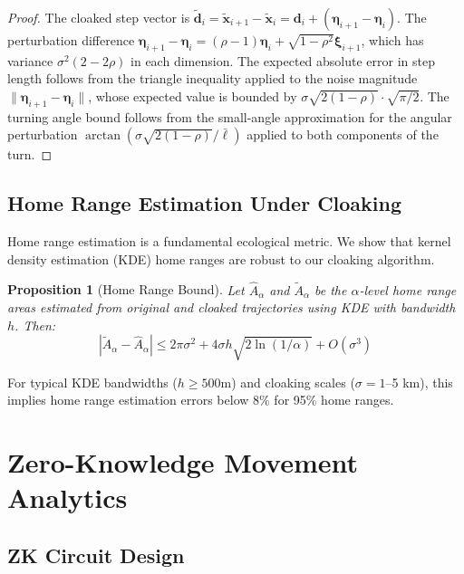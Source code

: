 \documentclass[11pt,letterpaper]{article}
\newtheorem{proposition}[theorem]{Proposition}
\begin{document}
\begin{proof}
The cloaked step vector is $\tilde{\mathbf{d}}_i = \tilde{\mathbf{x}}_{i+1} - \tilde{\mathbf{x}}_i = \mathbf{d}_i + (\boldsymbol{\eta}_{i+1} - \boldsymbol{\eta}_i)$. The perturbation difference $\boldsymbol{\eta}_{i+1} - \boldsymbol{\eta}_i = (\rho - 1)\boldsymbol{\eta}_i + \sqrt{1-\rho^2}\boldsymbol{\xi}_{i+1}$, which has variance $\sigma^2(2 - 2\rho)$ in each dimension. The expected absolute error in step length follows from the triangle inequality applied to the noise magnitude $\|\boldsymbol{\eta}_{i+1} - \boldsymbol{\eta}_i\|$, whose expected value is bounded by $\sigma\sqrt{2(1-\rho)} \cdot \sqrt{\pi/2}$. The turning angle bound follows from the small-angle approximation for the angular perturbation $\arctan(\sigma\sqrt{2(1-\rho)}/\bar{\ell})$ applied to both components of the turn.
\end{proof}

\subsection{Home Range Estimation Under Cloaking}

Home range estimation is a fundamental ecological metric. We show that kernel density estimation (KDE) home ranges are robust to our cloaking algorithm.

\begin{proposition}[Home Range Bound]
Let $\hat{A}_\alpha$ and $\tilde{A}_\alpha$ be the $\alpha$-level home range areas estimated from original and cloaked trajectories using KDE with bandwidth $h$. Then:
\begin{equation}
|\tilde{A}_\alpha - \hat{A}_\alpha| \leq 2\pi \sigma^2 + 4\sigma h \sqrt{2\ln(1/\alpha)} + O(\sigma^3)
\end{equation}
\end{proposition}

For typical KDE bandwidths ($h \geq 500$m) and cloaking scales ($\sigma = 1$--5 km), this implies home range estimation errors below 8\% for 95\% home ranges.

\section{Zero-Knowledge Movement Analytics}

\subsection{ZK Circuit Design}
\end{document}
